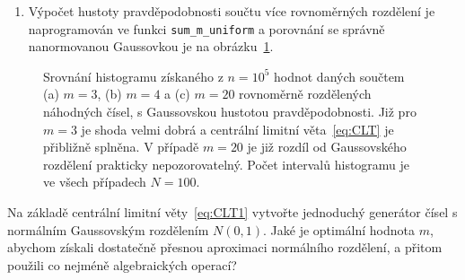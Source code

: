 \documentclass[a4paper,11pt,twoside]{article}
\def\code#1{\textnormal{\texttt{#1}}}
\theoremstyle{red}
\theoremstyle{green}
\begin{document}
\begin{solution}
\begin{enumerate}
            \item  
                Výpočet hustoty pravděpodobnosti součtu více rovnoměrných rozdělení je naprogramován ve funkci \code{sum_m_uniform} a porovnání se správně nanormovanou Gaussovkou je na obrázku~\ref{fig:Gaussian}. 
        \end{enumerate}

        \begin{figure}[!htb]
            \begin{subfigure}{0.33\linewidth}
                \centering{}
                \caption{}
            \end{subfigure}
            \begin{subfigure}{0.33\linewidth}
                \centering{}
                \caption{}
            \end{subfigure}
            \begin{subfigure}{0.33\linewidth}
                \centering{}
                \caption{}
            \end{subfigure}
            \caption{
                \protect\small
                Srovnání histogramu získaného z $n=10^{5}$ hodnot daných součtem (a) $m=3$, (b) $m=4$ a (c) $m=20$ rovnoměrně rozdělených náhodných čísel, s Gaussovskou hustotou pravděpodobnosti. 
                Již pro $m=3$ je shoda velmi dobrá a centrální limitní věta~\eqref{eq:CLT} je přibližně splněna.
                V případě $m=20$ je již rozdíl od Gaussovského rozdělení prakticky nepozorovatelný.
                Počet intervalů histogramu je ve všech případech $N=100$.
            }
            \label{fig:Gaussian}
        \end{figure}    
    \end{solution}

    \begin{task}\label{task:NormalDistribution}
        Na základě centrální limitní věty~\eqref{eq:CLT1} vytvořte jednoduchý generátor čísel s normálním Gaussovským rozdělením $N(0,1)$.
        Jaké je optimální hodnota $m$, abychom získali dostatečně přesnou aproximaci normálního rozdělení, a přitom použili co nejméně algebraických operací?
    \end{task}
\end{document}
